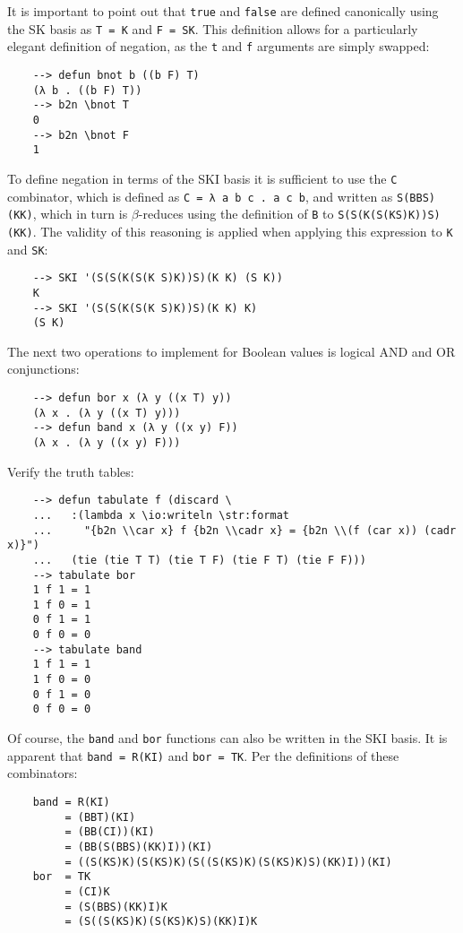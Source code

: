 It is important to point out that \verb|true| and \verb|false| are defined canonically using the SK basis as \verb|T = K| and \verb|F = SK|. This definition allows for a particularly elegant definition of negation, as the \verb|t| and \verb|f| arguments are simply swapped:

\begin{Verbatim}
    --> defun bnot b ((b F) T)
    (λ b . ((b F) T))
    --> b2n \bnot T
    0
    --> b2n \bnot F
    1
\end{Verbatim}

To define negation in terms of the SKI basis it is sufficient to use the \verb|C| combinator, which is defined as \verb|C = λ a b c . a c b|, and written as \verb|S(BBS)(KK)|, which in turn is $\beta$-reduces using the definition of \verb|B| to \verb|S(S(K(S(KS)K))S)(KK)|. The validity of this reasoning is applied when applying this expression to \verb|K| and \verb|SK|:

\begin{Verbatim}
    --> SKI '(S(S(K(S(K S)K))S)(K K) (S K))
    K
    --> SKI '(S(S(K(S(K S)K))S)(K K) K)
    (S K)
\end{Verbatim}

The next two operations to implement for Boolean values is logical AND and OR conjunctions:

\begin{Verbatim}
    --> defun bor x (λ y ((x T) y))
    (λ x . (λ y ((x T) y)))
    --> defun band x (λ y ((x y) F))
    (λ x . (λ y ((x y) F)))
\end{Verbatim}

Verify the truth tables:

\begin{Verbatim}
    --> defun tabulate f (discard \
    ...   :(lambda x \io:writeln \str:format
    ...     "{b2n \\car x} f {b2n \\cadr x} = {b2n \\(f (car x)) (cadr x)}")
    ...   (tie (tie T T) (tie T F) (tie F T) (tie F F)))
    --> tabulate bor
    1 f 1 = 1
    1 f 0 = 1
    0 f 1 = 1
    0 f 0 = 0
    --> tabulate band
    1 f 1 = 1
    1 f 0 = 0
    0 f 1 = 0
    0 f 0 = 0
\end{Verbatim}

Of course, the \verb|band| and \verb|bor| functions can also be written in the SKI basis. It is apparent that \verb|band = R(KI)| and \verb|bor = TK|. Per the definitions of these combinators:

\begin{Verbatim}
    band = R(KI)
         = (BBT)(KI)
         = (BB(CI))(KI)
         = (BB(S(BBS)(KK)I))(KI)
         = ((S(KS)K)(S(KS)K)(S((S(KS)K)(S(KS)K)S)(KK)I))(KI)
    bor  = TK
         = (CI)K
         = (S(BBS)(KK)I)K
         = (S((S(KS)K)(S(KS)K)S)(KK)I)K
\end{Verbatim}

